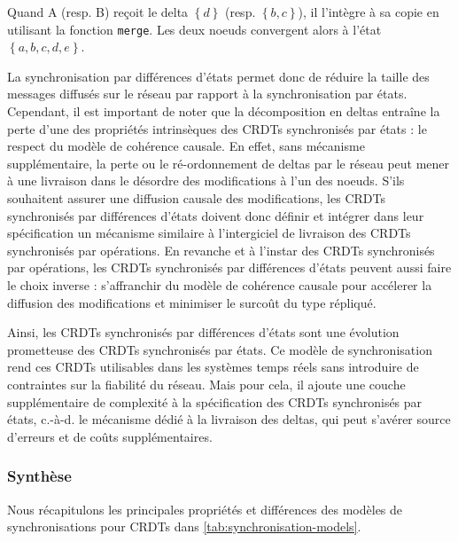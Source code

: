 \documentclass[12pt]{thesul}
\newcommand{\ie}{c.-à-d. }
\newcommand{\set}[1]{\left\{#1\right\}} %
\begin{document}
Quand A (resp. B) reçoit le delta $\set{d}$ (resp. $\set{b,c}$), il l'intègre à sa copie en utilisant la fonction \texttt{merge}.
Les deux noeuds convergent alors à l'état $\set{a,b,c,d,e}$.

La synchronisation par différences d'états permet donc de réduire la taille des messages diffusés sur le réseau par rapport à la synchronisation par états.
Cependant, il est important de noter que la décomposition en deltas entraîne la perte d'une des propriétés intrinsèques des \acp{CRDT} synchronisés par états : le respect du modèle de cohérence causale.
En effet, sans mécanisme supplémentaire, la perte ou le ré-ordonnement de deltas par le réseau peut mener à une livraison dans le désordre des modifications à l'un des noeuds.
S'ils souhaitent assurer une diffusion causale des modifications, les \acp{CRDT} synchronisés par différences d'états doivent donc définir et intégrer dans leur spécification un mécanisme similaire à l'intergiciel de livraison des \acp{CRDT} synchronisés par opérations.
En revanche et à l'instar des \acp{CRDT} synchronisés par opérations, les \acp{CRDT} synchronisés par différences d'états peuvent aussi faire le choix inverse : s'affranchir du modèle de cohérence causale pour accélerer la diffusion des modifications et minimiser le surcoût du type répliqué.

Ainsi, les \acp{CRDT} synchronisés par différences d'états sont une évolution prometteuse des \acp{CRDT} synchronisés par états.
Ce modèle de synchronisation rend ces \acp{CRDT} utilisables dans les systèmes temps réels sans introduire de contraintes sur la fiabilité du réseau.
Mais pour cela, il ajoute une couche supplémentaire de complexité à la spécification des \acp{CRDT} synchronisés par états, \ie le mécanisme dédié à la livraison des deltas, qui peut s'avérer source d'erreurs et de coûts supplémentaires.

\subsubsection{Synthèse}

Nous récapitulons les principales propriétés et différences des modèles de synchronisations pour \acp{CRDT} dans \autoref{tab:synchronisation-models}.
\end{document}

